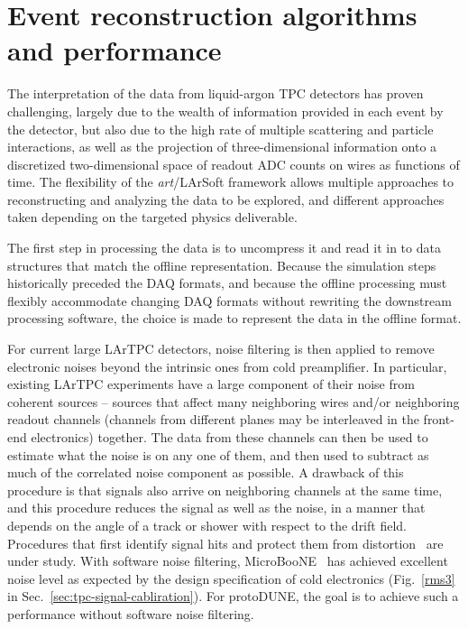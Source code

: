 \section{Event reconstruction algorithms and performance}
\label{sec:larsoftreco}

The interpretation of the data from liquid-argon TPC detectors has
proven challenging, largely due to the wealth of information provided
in each event by the detector, but also due to the high rate of
multiple scattering and particle interactions, as well as the
projection of three-dimensional information onto a discretized
two-dimensional space of readout ADC counts on wires as functions of
time.  The flexibility of the {\it{art}}/LArSoft framework allows
multiple approaches to reconstructing and analyzing the data to be
explored, and different approaches taken depending on the targeted
physics deliverable.

The first step in processing the data is to uncompress it and read it
in to data structures that match the offline representation.  Because
the simulation steps historically preceded the DAQ formats, and
because the offline processing must flexibly accommodate changing DAQ
formats without rewriting the downstream processing software, the
choice is made to represent the data in the offline format.


For current large LArTPC detectors, noise filtering is then applied to remove
electronic noises beyond the intrinsic ones from cold preamplifier.
In particular, existing LArTPC experiments have a
large component of their noise from coherent sources -- sources that
affect many neighboring wires and/or neighboring readout channels
(channels from different planes may be interleaved in the front-end
electronics) together.  The data from these channels can then be used
to estimate what the noise is on any one of them, and then used to
subtract as much of the correlated noise component as possible.  A
drawback of this procedure is that signals also arrive on neighboring
channels at the same time, and this procedure reduces the signal as
well as the noise, in a manner that depends on the angle of a track or
shower with respect to the drift field.  Procedures that first
identify signal hits and protect them from distortion~\cite{microboone_noise} 
are under study. With software noise filtering, MicroBooNE~\cite{noise_filter}
has achieved excellent noise level as expected by the design specification
of cold electronics (Fig.~\ref{rms3} in Sec.~\ref{sec:tpc-signal-cabliration}).
For protoDUNE, the goal is to achieve such a performance without 
software noise filtering. 

